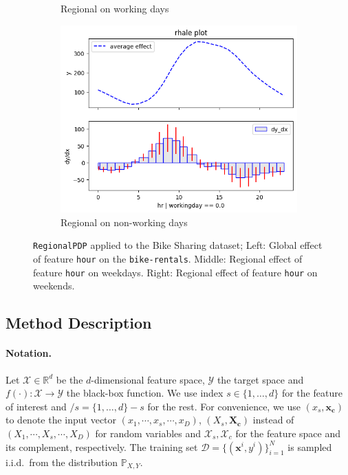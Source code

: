 \documentclass[
twocolumn,
]{ceurart}
\newcommand{\xb}{\mathbf{x}}
\newcommand{\xc}{\mathbf{x_c}}
\newcommand{\Xc}{\mathbf{X_c}}
\begin{document}
\begin{figure}
\begin{subfigure}[t]{0.32\textwidth}
  \caption{Regional on working days}
  \label{subfig:regional_a}
  \end{subfigure}
  \begin{subfigure}[t]{0.32\textwidth}
  \centering  
  \includegraphics[width=\linewidth]{figures/running_example/01_bike_sharing_dataset_29_0.png}
  \caption{Regional on non-working days}
  \label{subfig:regional_b}
  \end{subfigure}
  \caption{\texttt{RegionalPDP} applied to the Bike Sharing dataset; Left: Global effect of feature \texttt{hour} on the \texttt{bike-rentals}. Middle: Regional effect of feature \texttt{hour} on weekdays. Right: Regional effect of feature \texttt{hour} on weekends.}
  \label{fig:main-concept}
\end{figure}

\subsection{Method Description}

\paragraph{Notation.}

Let \(\mathcal{X} \in \mathbb{R}^d\) be the \(d\)-dimensional feature space, \(\mathcal{Y}\) the target space and
\(f(\cdot) : \mathcal{X} \rightarrow \mathcal{Y}\) the black-box function.
We use index \(s \in \{1, \ldots, d\}\) for the feature of interest and \(/s = \{1, \ldots, d\} - s\) for the rest.
For convenience, we use \((x_s, \xc)\) to denote the input vector \((x_1, \cdots , x_s, \cdots, x_D)\),
\((X_s, \Xc)\) instead of \((X_1, \cdots , X_s, \cdots, X_D)\) for random variables and
$\mathcal{X}_s, \mathcal{X}_{c}$ for the feature space and its complement, respectively.
The training set \(\mathcal{D} = \{(\xb^i, y^i)\}_{i=1}^N\) is sampled
i.i.d.\ from the distribution \(\mathbb{P}_{X,Y}\).
\end{document}
